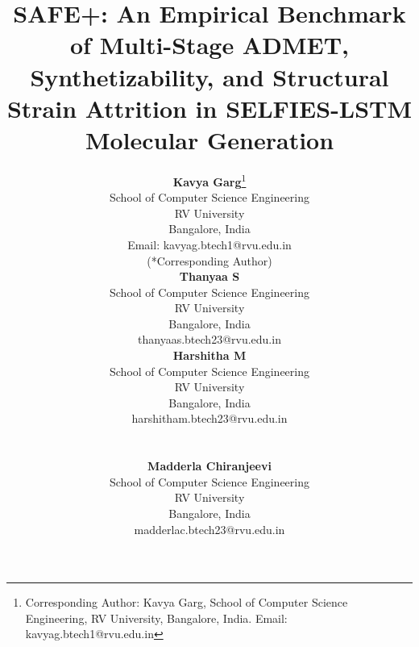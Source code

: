 \documentclass[conference]{IEEEtran}
\begin{document}
\sloppy
\raggedbottom

\title{SAFE+: An Empirical Benchmark of Multi-Stage ADMET, Synthetizability, and Structural Strain Attrition in SELFIES-LSTM Molecular Generation}

\author{
\begin{minipage}[t]{0.33\textwidth}
\centering \textbf{Kavya Garg}\thanks{Corresponding Author: Kavya Garg, School of Computer Science Engineering, RV University, Bangalore, India. Email: kavyag.btech1@rvu.edu.in} \\ School of Computer Science Engineering \\
RV University \\ Bangalore, India \\ Email: kavyag.btech1@rvu.edu.in \\ (*Corresponding Author)
\end{minipage}%
\begin{minipage}[t]{0.33\textwidth}
\centering \textbf{Thanyaa S} \\ School of Computer Science Engineering \\
RV University \\ Bangalore, India \\ thanyaas.btech23@rvu.edu.in
\end{minipage}
\begin{minipage}[t]{0.33\textwidth}
\centering \textbf{Harshitha M} \\ School of Computer Science Engineering \\
RV University \\ Bangalore, India \\ harshitham.btech23@rvu.edu.in
\end{minipage}%
\\[0.3cm]
\begin{minipage}[t]{1.0\textwidth}
\centering \textbf{Madderla Chiranjeevi} \\ School of Computer Science Engineering \\
RV University \\ Bangalore, India \\ madderlac.btech23@rvu.edu.in
\end{minipage}
}

\maketitle
\end{document}
